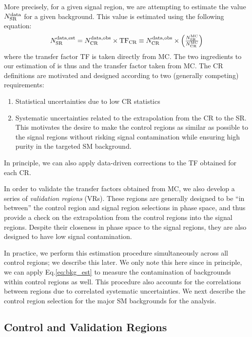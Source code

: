 More precisely, for a given signal region, we are attempting to estimate the value $\ntext{SR}{data}$ for a given background.
This value is estimated using the following equation:
\begin{align}\label{eq:bkg_est}
\ntext{SR}{data,est} = \ntext{CR}{data,obs} \times \text{TF}_{\text{CR}} \equiv \ntext{CR}{data,obs} \times  \begin{pmatrix} \frac{ \ntext{SR}{MC} }{ \ntext{CR}{MC} } \end{pmatrix}
\end{align}
where the transfer factor TF is taken directly from MC.
The two ingredients to our estimation of  is thus  and the transfer factor taken from MC.
The CR definitions are motivated and designed according to two (generally competing) requirements:
\begin{enumerate}
\item Statistical uncertainties due to low CR statistics
\item Systematic uncertainties related to the extrapolation from the CR to the SR.  This motivates the desire to make the control regions as similar as possible to the signal regions without risking signal contamination while ensuring high purity in the targeted SM background.
\end{enumerate}
In principle, we can also apply data-driven corrections to the TF obtained for each CR.

In order to validate the transfer factors obtained from MC, we also develop a series of \textit{validation regions} (VRs).
These regions are generally designed to be ``in between'' the control region and signal region selections in phase space, and thus provide a check on the extrapolation from the control regions into the signal regions.
Despite their closeness in phase space to the signal regions, they are also designed to have low signal contamination.

In practice, we perform this estimation procedure simultaneously across all control regions; we describe this later.
We only note this here since in principle, we can apply Eq.\ref{eq:bkg_est} to measure the contamination of backgrounds within control regions as well.
This procedure also accounts for the correlations between regions due to correlated systematic uncertainties.
We next describe the control region selection for the major SM backgrounds for the analysis.

\subsection{Control and Validation Regions}

